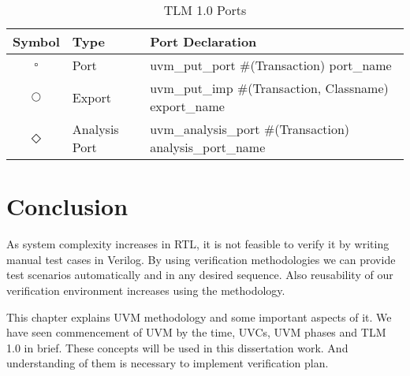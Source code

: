 \vspace{1cm}

\noindent
\begin{table}[ht]
	\centering
	\begin{tabular}{| c | m{2.5cm} | m{4cm} |} 
		\hline
		Symbol & Type & Port Declaration  \\ \hline 
		$\square$ & Port & uvm\_put\_port \#(Transaction) port\_name   \\ \hline
		$\bigcirc$ & Export & uvm\_put\_imp \#(Transaction, Classname) export\_name  \\ \hline
		$\Diamond$ & Analysis Port & uvm\_analysis\_port \#(Transaction) analysis\_port\_name \\ \hline
	\end{tabular}
	\caption{TLM 1.0 Ports}
	\label{tlm}
\end{table}

\section{Conclusion}

As system complexity increases in RTL, it is not feasible to verify it by writing manual test cases in Verilog. By using verification methodologies we can provide test scenarios automatically and in any desired sequence. Also reusability of our verification environment increases using the methodology. \par

This chapter explains UVM methodology and some important aspects of it. We have seen commencement of UVM by the time, UVCs, UVM phases and TLM 1.0 in brief. These concepts will be used in this dissertation work. And understanding of them is necessary to implement verification plan.